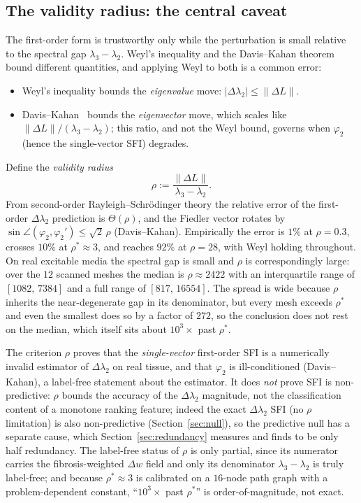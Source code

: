 \documentclass[11pt]{article}
\theoremstyle{definition}
\newcommand{\lam}{\lambda}
\newcommand{\phii}{\varphi}
\newcommand{\rhoval}{\rho}
\begin{document}
\subsection{The validity radius: the central caveat}
\label{sec:validity}
The first-order form is trustworthy only while the perturbation is small
relative to the spectral gap $\lam_3-\lam_2$. Weyl's inequality and the
Davis--Kahan theorem bound different quantities, and applying Weyl to both is a
common error:
\begin{itemize}[nosep,leftmargin=1.4em]
\item Weyl's inequality bounds the \emph{eigenvalue} move:
      $\lvert\Delta\lam_2\rvert\leq\lVert\Delta L\rVert$.
\item Davis--Kahan~\cite{daviskahan1970} bounds the
      \emph{eigenvector} move, which scales like
      $\lVert\Delta L\rVert/(\lam_3-\lam_2)$; this ratio, and not the Weyl
      bound, governs when $\phii_2$ (hence the single-vector SFI) degrades.
\end{itemize}
Define the \emph{validity radius}
\begin{equation}
\rhoval:=\frac{\lVert\Delta L\rVert}{\lam_3-\lam_2}.
\end{equation}
From second-order Rayleigh--Schr\"odinger theory the relative error of the
first-order $\Delta\lam_2$ prediction is $\Theta(\rhoval)$, and the Fiedler
vector rotates by $\sin\angle(\phii_2,\phii_2')\leq\sqrt{2}\,\rhoval$
(Davis--Kahan). Empirically the error is $1\%$ at $\rhoval=0.3$, crosses $10\%$
at $\rhoval^\ast\approx 3$, and reaches $92\%$ at $\rhoval=28$, with Weyl holding
throughout. On real excitable media the spectral gap is small and $\rhoval$ is
correspondingly large: over the $12$ scanned meshes the median is
$\rhoval\approx2422$ with an interquartile range of $[1082,\,7384]$ and a full
range of $[817,\,16554]$. The spread is wide because $\rhoval$ inherits the
near-degenerate gap in its denominator, but every mesh exceeds $\rhoval^\ast$ and
even the smallest does so by a factor of $272$, so the conclusion does not rest
on the median, which itself sits about $10^3\times$ past $\rhoval^\ast$.

The criterion $\rhoval$ proves that the
\emph{single-vector} first-order SFI is a numerically invalid estimator of
$\Delta\lam_2$ on real tissue, and that $\phii_2$ is ill-conditioned
(Davis--Kahan), a label-free statement about the estimator. It does
\emph{not} prove SFI is non-predictive: $\rhoval$ bounds the accuracy of the
$\Delta\lam_2$ magnitude, not the classification content of a monotone
ranking feature; indeed the exact $\Delta\lam_2$ SFI (no $\rhoval$
limitation) is also non-predictive (Section~\ref{sec:null}), so the
predictive null has a separate cause, which Section~\ref{sec:redundancy} measures
and finds to be only half redundancy. The label-free status of $\rhoval$ is only
partial, since its numerator carries the fibrosis-weighted $\Delta w$ field and
only its denominator $\lam_3-\lam_2$ is truly label-free; and because
$\rhoval^\ast\approx3$ is calibrated on a $16$-node path graph with a
problem-dependent constant, ``$10^3\times$ past $\rhoval^\ast$'' is
order-of-magnitude, not exact.
\end{document}

